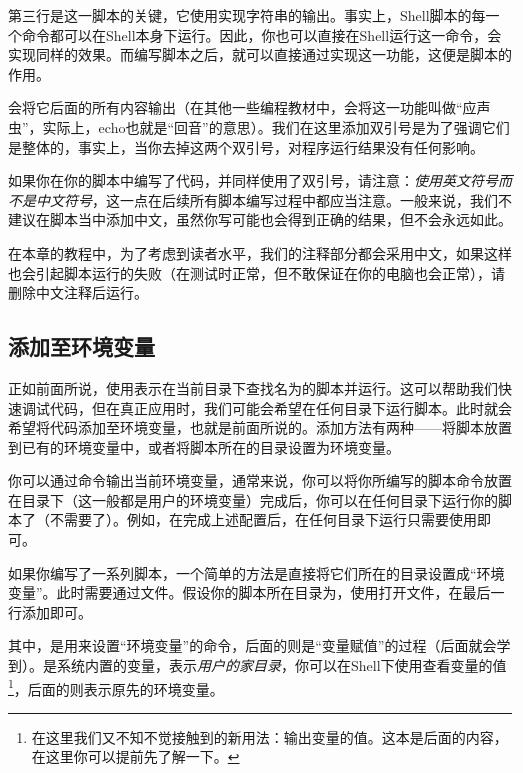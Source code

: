 第三行是这一脚本的关键，它使用实现字符串的输出。事实上，Shell脚本的每一个命令都可以在Shell本身下运行。因此，你也可以直接在Shell运行这一命令，会实现同样的效果。而编写脚本之后，就可以直接通过实现这一功能，这便是脚本的作用。

\begin{attention}
    会将它后面的所有内容输出（在其他一些编程教材中，会将这一功能叫做“应声虫”，实际上，echo也就是“回音”的意思）。我们在这里添加双引号是为了强调它们是整体的，事实上，当你去掉这两个双引号，对程序运行结果没有任何影响。

    如果你在你的脚本中编写了代码，并同样使用了双引号，请注意：\emph{使用英文符号而不是中文符号}，这一点在后续所有脚本编写过程中都应当注意。一般来说，我们不建议在脚本当中添加中文，虽然你写可能也会得到正确的结果，但不会永远如此。

    在本章的教程中，为了考虑到读者水平，我们的注释部分都会采用中文，如果这样也会引起脚本运行的失败（在测试时正常，但不敢保证在你的电脑也会正常），请删除中文注释后运行。
\end{attention}

\subsection{添加至环境变量}\label{subsec:第一个脚本-添加至环境变量}

正如前面所说，使用表示在当前目录下查找名为的脚本并运行。这可以帮助我们快速调试代码，但在真正应用时，我们可能会希望在任何目录下运行脚本。此时就会希望将代码添加至环境变量，也就是前面所说的。添加方法有两种——将脚本放置到已有的环境变量中，或者将脚本所在的目录设置为环境变量。

你可以通过命令输出当前环境变量，通常来说，你可以将你所编写的脚本命令放置在目录下（这一般都是用户的环境变量）完成后，你可以在任何目录下运行你的脚本了（不需要了）。例如，在完成上述配置后，在任何目录下运行只需要使用即可。

如果你编写了一系列脚本，一个简单的方法是直接将它们所在的目录设置成“环境变量”。此时需要通过文件。假设你的脚本所在目录为，使用打开文件，在最后一行添加即可。

其中，是用来设置“环境变量”的命令，后面的则是“变量赋值”的过程（后面就会学到）。是系统内置的变量，表示\emph{用户的家目录}，你可以在Shell下使用查看变量的值\footnote{在这里我们又不知不觉接触到的新用法：输出变量的值。这本是后面的内容，在这里你可以提前先了解一下。}，后面的则表示原先的环境变量。

